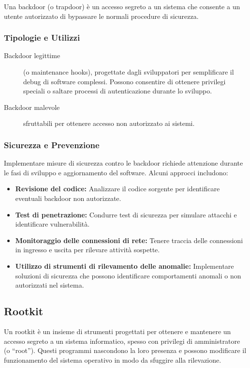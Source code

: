 Una backdoor (o trapdoor) è un accesso segreto a un sistema che consente a un utente autorizzato di bypassare le normali procedure di sicurezza.

\subsubsection{Tipologie e Utilizzi}

\begin{description}
    \item[Backdoor legittime] (o maintenance hooks), progettate dagli sviluppatori per semplificare il debug di software complessi. Possono consentire di ottenere privilegi speciali o saltare processi di autenticazione durante lo sviluppo.
    \item[Backdoor malevole] sfruttabili per ottenere accesso non autorizzato ai sistemi.
\end{description}

\subsubsection{Sicurezza e Prevenzione}

Implementare misure di sicurezza contro le backdoor richiede attenzione durante le fasi di sviluppo e aggiornamento del software. Alcuni approcci includono:

\begin{itemize}
    \item \textbf{Revisione del codice:} Analizzare il codice sorgente per identificare eventuali backdoor non autorizzate.
    \item \textbf{Test di penetrazione:} Condurre test di sicurezza per simulare attacchi e identificare vulnerabilità.
    \item \textbf{Monitoraggio delle connessioni di rete:} Tenere traccia delle connessioni in ingresso e uscita per rilevare attività sospette.
    \item \textbf{Utilizzo di strumenti di rilevamento delle anomalie:} Implementare soluzioni di sicurezza che possono identificare comportamenti anomali o non autorizzati nel sistema.
\end{itemize}

\subsection{Rootkit}

Un rootkit è un insieme di strumenti progettati per ottenere e mantenere un accesso segreto a un sistema informatico, spesso con privilegi di amministratore (o ``root''). Questi programmi nascondono la loro presenza e possono modificare il funzionamento del sistema operativo in modo da sfuggire alla rilevazione.


